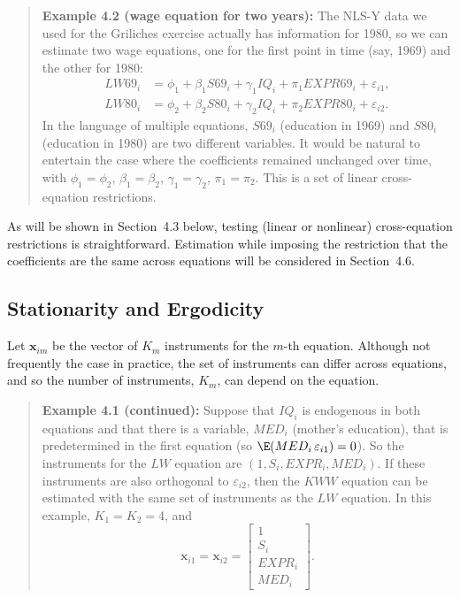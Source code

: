 \begin{quote}
\textbf{Example 4.2 (wage equation for two years):}\quad
The NLS-Y data we used for the Griliches exercise actually has information for 1980,
so we can estimate two wage equations, one for the first point in time (say, 1969)
and the other for 1980:
\begin{align*}
LW69_i &= \phi_1 + \beta_1 S69_i + \gamma_1 IQ_i + \pi_1 EXPR69_i + \varepsilon_{i1}, \\
LW80_i &= \phi_2 + \beta_2 S80_i + \gamma_2 IQ_i + \pi_2 EXPR80_i + \varepsilon_{i2}.
\end{align*}
In the language of multiple equations, $S69_i$ (education in 1969) and $S80_i$
(education in 1980) are two different variables. It would be natural to entertain
the case where the coefficients remained unchanged over time, with
$\phi_1 = \phi_2$, $\beta_1 = \beta_2$, $\gamma_1 = \gamma_2$, $\pi_1 = \pi_2$.
This is a set of linear cross-equation restrictions.
\end{quote}

As will be shown in Section~4.3 below, testing (linear or nonlinear) cross-equation
restrictions is straightforward. Estimation while imposing the restriction that the
coefficients are the same across equations will be considered in Section~4.6.

\subsection*{Stationarity and Ergodicity}

Let $\mathbf{x}_{im}$ be the vector of $K_m$ instruments for the $m$-th equation. Although not
frequently the case in practice, the set of instruments can differ across equations,
and so the number of instruments, $K_m$, can depend on the equation.

\begin{quote}
\textbf{Example 4.1 (continued):}\quad
Suppose that $IQ_i$ is endogenous in both equations
and that there is a variable, $MED_i$ (mother's education), that is predetermined
in the first equation (so $\E(MED_i\, \varepsilon_{i1}) = 0$). So the instruments for the $LW$
equation are $(1, S_i, EXPR_i, MED_i)$. If these instruments are also orthogonal
to $\varepsilon_{i2}$, then the $KWW$ equation can be estimated with the same set of instruments
as the $LW$ equation. In this example, $K_1 = K_2 = 4$, and
\begin{equation}
\mathbf{x}_{i1} = \mathbf{x}_{i2} = \begin{bmatrix} 1 \\ S_i \\ EXPR_i \\ MED_i \end{bmatrix}.
\label{eq:4.1.3}
\end{equation}
\end{quote}

